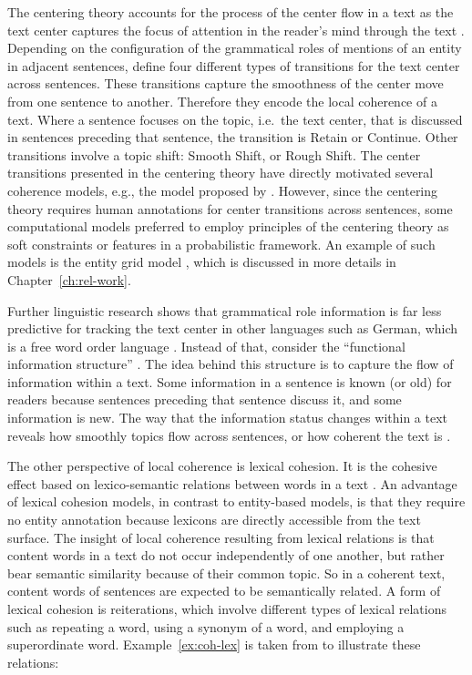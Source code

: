 The centering theory accounts for the process of the center flow in a text as the text center captures the focus of attention in the reader's mind through the text \cite{grosz95}. 
Depending on the configuration of the grammatical roles of mentions of an entity in adjacent sentences,  define four different types of transitions for the text center across sentences. 
These transitions capture the smoothness of the center move from one sentence to another.
Therefore they encode the local coherence of a text.  
Where a sentence focuses on the topic, i.e.\ the text center, that is discussed in sentences preceding that sentence, the transition is Retain or Continue. 
Other transitions involve a topic shift: Smooth Shift, or Rough Shift. 
The center transitions presented in the centering theory have directly motivated several coherence models, e.g., the model proposed by .  
However, since the centering theory requires human annotations for center transitions across sentences, some computational models preferred to employ principles of the centering theory as soft constraints or features in a probabilistic framework. An example of such models is the entity grid model \cite{barzilay05a,barzilay08}, which is discussed in more details in Chapter~\ref{ch:rel-work}. 

Further linguistic research shows that grammatical role information is far less predictive for tracking the text center in other languages such as German, which is a free word order language \cite{strube.acl96}. 
Instead of that,  consider the ``functional information structure'' \cite{danes74a}.  
The idea behind this structure is to capture the flow of information within a text.  
Some information in a sentence is known (or old) for readers because sentences preceding that sentence discuss it, and some information is new. 
The way that the information status changes within a text reveals how smoothly topics flow across sentences, or how coherent the text is \cite{danes74a}.    

The other perspective of local coherence is lexical cohesion. 
It is the cohesive effect based on lexico-semantic relations between words in a text \cite{halliday76}.  
An advantage of lexical cohesion models, in contrast to entity-based models, is that they require no entity annotation because lexicons are directly accessible from the text surface.  
The insight of local coherence resulting from lexical relations is that content words in a text do not occur independently of one another, but rather bear semantic similarity because of their common topic. 
So in a coherent text, content words of sentences are expected to be semantically related.  
A form of lexical cohesion is reiterations, which involve different types of lexical relations such as repeating a word, using a synonym of a word, and employing a superordinate word. 
Example~\ref{ex:coh-lex} is taken from  to illustrate these relations:



